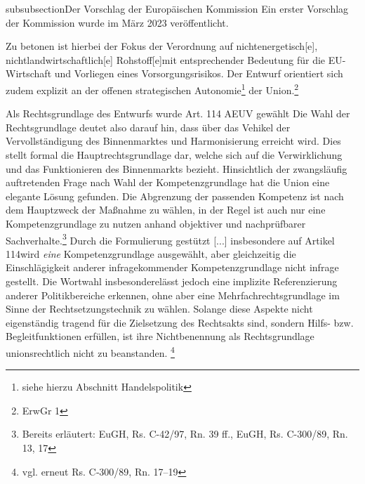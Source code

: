 \documentclass[12pt,a4paper,oneside]{book} %
\begin{document}
subsubsection{Der Vorschlag der Europäischen Kommission}
Ein erster Vorschlag der Kommission wurde im März 2023 veröffentlicht.

Zu betonen ist hierbei der Fokus der Verordnung auf \glqq nichtenergetisch[e], nichtlandwirtschaftlich[e] Rohstoff[e]\grqq mit entsprechender Bedeutung für die EU-Wirtschaft und Vorliegen eines Vorsorgungsrisikos. Der Entwurf orientiert sich zudem explizit an der offenen strategischen Autonomie\footnote{siehe hierzu Abschnitt Handelspolitik} der Union.\footnote{ErwGr 1}

Als Rechtsgrundlage des Entwurfs wurde Art. 114 AEUV gewählt
Die Wahl der Rechtsgrundlage deutet also darauf hin, dass über das Vehikel der Vervollständigung des Binnenmarktes und Harmonisierung erreicht wird.  Dies stellt formal die Hauptrechtsgrundlage dar, welche sich auf die Verwirklichung und das Funktionieren des Binnenmarkts bezieht.
Hinsichtlich der zwangsläufig auftretenden Frage nach Wahl der Kompetenzgrundlage hat die Union eine elegante Lösung gefunden. Die Abgrenzung der passenden Kompetenz ist nach dem Hauptzweck der Maßnahme zu wählen, in der Regel ist auch nur eine Kompetenzgrundlage zu nutzen anhand objektiver und nachprüfbarer Sachverhalte.\footnote{Bereits erläutert: EuGH, Rs. C-42/97, Rn. 39 ff., EuGH, Rs. C-300/89, Rn. 13, 17} Durch die Formulierung \glqq gestützt [...] insbesondere auf Artikel 114\grqq wird \textit{eine} Kompetenzgrundlage ausgewählt, aber gleichzeitig die Einschlägigkeit anderer infragekommender Kompetenzgrundlage nicht infrage gestellt. Die Wortwahl \glqq insbesondere\grqq lässt jedoch eine implizite Referenzierung anderer Politikbereiche erkennen, ohne aber eine  Mehrfachrechtsgrundlage im Sinne der Rechtsetzungstechnik zu wählen. Solange diese Aspekte nicht eigenständig tragend für die Zielsetzung des Rechtsakts sind, sondern Hilfs- bzw. Begleitfunktionen erfüllen, ist ihre Nichtbenennung als Rechtsgrundlage unionsrechtlich nicht zu beanstanden. \footnote{vgl. erneut Rs. C‑300/89, Rn. 17–19}
\end{document}
